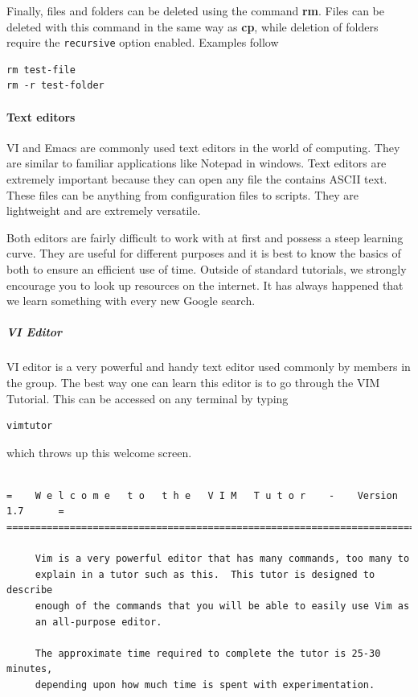 \documentclass[11pt]{article}
\begin{document}
Finally, files and folders can be deleted using the command \textbf{rm}.
Files can be deleted with this command in the same way as \textbf{cp},
while deletion of folders require the \texttt{recursive} option enabled.
Examples follow

\begin{verbatim}
rm test-file
rm -r test-folder
\end{verbatim}

    \paragraph{Text editors}\label{text-editors}

VI and Emacs are commonly used text editors in the world of computing.
They are similar to familiar applications like Notepad in windows. Text
editors are extremely important because they can open any file the
contains ASCII text. These files can be anything from configuration
files to scripts. They are lightweight and are extremely versatile.

Both editors are fairly difficult to work with at first and possess a
steep learning curve. They are useful for different purposes and it is
best to know the basics of both to ensure an efficient use of time.
Outside of standard tutorials, we strongly encourage you to look up
resources on the internet. It has always happened that we learn
something with every new Google search.

\subparagraph{VI Editor}\label{vi-editor}

VI editor is a very powerful and handy text editor used commonly by
members in the group. The best way one can learn this editor is to go
through the VIM Tutorial. This can be accessed on any terminal by typing

\begin{verbatim}
vimtutor
\end{verbatim}

which throws up this welcome screen.

\begin{verbatim}

=    W e l c o m e   t o   t h e   V I M   T u t o r    -    Version 1.7      =
===============================================================================

     Vim is a very powerful editor that has many commands, too many to
     explain in a tutor such as this.  This tutor is designed to describe
     enough of the commands that you will be able to easily use Vim as
     an all-purpose editor.

     The approximate time required to complete the tutor is 25-30 minutes,
     depending upon how much time is spent with experimentation.
\end{verbatim}
\end{document}
